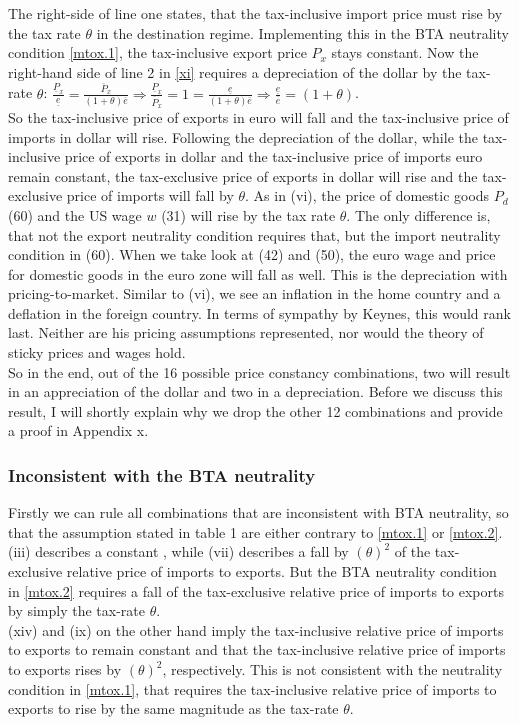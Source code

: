 The right-side of line one states, that the tax-inclusive import price must rise by the tax rate $\theta$ in the destination regime. Implementing this in the BTA neutrality condition \eqref{mtox.1}, the tax-inclusive export price $P_x$ stays constant. Now the right-hand side of line 2 in \eqref{xi} requires a depreciation of the dollar by the tax-rate $\theta$: $\frac{\underline P_x}{\underline e} = \frac{\overline P_x}{(1+\theta)\overline e} \Rightarrow \frac{\underline P_x}{\overline P_x} = 1 = \frac{\underline e}{(1+\theta)\overline e} \Rightarrow \frac{\underline e}{\overline e} = (1+\theta)$.\\
So the tax-inclusive price of exports in euro will fall and the tax-inclusive price of imports in dollar will rise. Following the depreciation of the dollar, while the tax-inclusive price of exports in dollar and the tax-inclusive price of imports euro remain constant, the tax-exclusive price of exports in dollar will rise and the tax-exclusive price of imports will fall by $\theta$.
As in (vi), the price of domestic goods $P_d$ (60) and the US wage $w$ (31) will rise by the tax rate $\theta$. The only difference is, that not the export neutrality condition requires that, but the import neutrality condition in (60). When we take look at (42) and (50), the euro wage and price for domestic goods in the euro zone will fall as well. This is the depreciation with pricing-to-market. Similar to (vi), we see an inflation in the home country and a deflation in the foreign country. In terms of sympathy by Keynes, this would rank last. Neither are his pricing assumptions represented, nor would the theory of sticky prices and wages hold. \\

So in the end, out of the 16 possible price constancy combinations, two will result in an appreciation of the dollar and two in a depreciation. Before we discuss this result, I will shortly explain why we drop the other 12 combinations and provide a proof in Appendix x.

\subsubsection{Inconsistent with the BTA neutrality}
Firstly we can rule all combinations that are inconsistent with BTA neutrality, so that the assumption stated in table 1 are either contrary to \eqref{mtox.1} or \eqref{mtox.2}. (iii) describes a constant , while (vii) describes a fall by $(\theta)^2$ of the tax-exclusive relative price of imports to exports. But the BTA neutrality condition in \eqref{mtox.2} requires a fall of the tax-exclusive relative price of imports to exports by simply the tax-rate $\theta$.  \\
(xiv) and (ix) on the other hand imply the tax-inclusive relative price of imports to exports to remain constant and that the tax-inclusive relative price of imports to exports rises by $(\theta)^2$, respectively. This is not consistent with the neutrality condition in \eqref{mtox.1}, that requires the tax-inclusive relative price of imports to exports to rise by the same magnitude as the tax-rate $\theta$.

